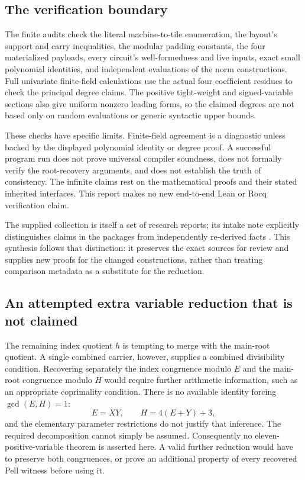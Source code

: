 \subsection{The verification boundary}

The finite audits check the literal machine-to-tile enumeration, the
layout's support and carry inequalities, the modular padding constants,
the four materialized payloads, every circuit's well-formedness and live
inputs, exact small polynomial identities, and independent evaluations
of the norm constructions.  Full univariate finite-field calculations
use the actual four coefficient residues to check the principal degree
claims.  The positive tight-weight and signed-variable sections also
give uniform nonzero leading forms, so the claimed degrees are not based
only on random evaluations or generic syntactic upper bounds.

These checks have specific limits.  Finite-field agreement is a
diagnostic unless backed by the displayed polynomial identity or degree
proof.  A successful program run does not prove universal compiler
soundness, does not formally verify the root-recovery arguments, and does
not establish the truth of consistency.  The infinite claims rest on
the mathematical proofs and their stated inherited interfaces.  This
report makes no new end-to-end Lean or Rocq verification claim.

The supplied collection is itself a set of research reports; its intake
note explicitly distinguishes claims in the packages from independently
re-derived facts \cite{collection}.  This synthesis follows that
distinction: it preserves the exact sources for review and supplies new
proofs for the changed constructions, rather than treating comparison
metadata as a substitute for the reduction.

\subsection{An attempted extra variable reduction that is not claimed}

The remaining index quotient $h$ is tempting to merge with the main-root
quotient.  A single combined carrier, however, supplies a combined
divisibility condition.  Recovering separately the index congruence
modulo $E$ and the main-root congruence modulo $H$ would require further
arithmetic information, such as an appropriate coprimality condition.
There is no available identity forcing $\gcd(E,H)=1$:
\[
 E=XY,\qquad H=4(E+Y)+3,
\]
and the elementary parameter restrictions do not justify that inference.
The required decomposition cannot simply be assumed.  Consequently no
eleven-positive-variable theorem is asserted here.  A valid further
reduction would have to preserve both congruences, or prove an additional
property of every recovered Pell witness before using it.

